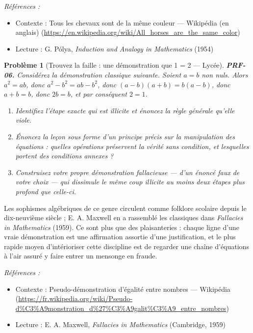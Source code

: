 \documentclass[11pt]{article}
\newtheorem{problem}{Problème}
\newenvironment{refs}{\par\small\noindent\emph{Références :}\begin{itemize}\setlength\itemsep{0pt}}{\end{itemize}\normalsize}
\begin{document}
\begin{refs}
\item Contexte : Tous les chevaux sont de la même couleur --- Wikipédia (en anglais) (\url{https://en.wikipedia.org/wiki/All_horses_are_the_same_color})
\item Lecture : G. Pólya, \textit{Induction and Analogy in Mathematics} (1954)
\end{refs}

\bigskip

\begin{problem}[{Trouvez la faille : une démonstration que 1 = 2 --- Lycée}]
\textbf{PRF-06.} Considérez la \og{} démonstration \fg{} classique suivante. \textit{Soient
$ a = b $ non nuls. Alors $ a^2 = ab $, donc $ a^2 - b^2 = ab - b^2 $, donc
$ (a-b)(a+b) = b(a-b) $, donc $ a + b = b $, donc $ 2b = b $, et par conséquent
$ 2 = 1 $.}
\begin{enumerate}
\item[(a)] Identifiez l'étape exacte qui est illicite et énoncez la règle générale qu'elle
viole.
\item[(b)] Énoncez la leçon sous forme d'un principe précis sur la manipulation des équations :
quelles opérations préservent la vérité sans condition, et lesquelles portent des
conditions annexes ?
\item[(c)] Construisez votre propre démonstration fallacieuse --- d'un énoncé faux de votre choix ---
qui dissimule le même coup illicite au moins deux étapes plus profond que celle-ci.
\end{enumerate}

\end{problem}

\noindent Les sophismes algébriques de ce genre circulent comme folklore scolaire
depuis le dix-neuvième siècle ; E. A. Maxwell en a rassemblé les classiques dans
\textit{Fallacies in Mathematics} (1959). Ce sont plus que des plaisanteries : chaque ligne
d'une vraie démonstration est une affirmation assortie d'une justification, et le plus
rapide moyen d'intérioriser cette discipline est de regarder une chaîne d'équations à l'air
assuré y faire entrer un mensonge en fraude.

\begin{refs}
\item Contexte : Pseudo-démonstration d'égalité entre nombres --- Wikipédia (\url{https://fr.wikipedia.org/wiki/Pseudo-d%C3%A9monstration_d%27%C3%A9galit%C3%A9_entre_nombres})
\item Lecture : E. A. Maxwell, \textit{Fallacies in Mathematics} (Cambridge, 1959)
\end{refs}
\end{document}
